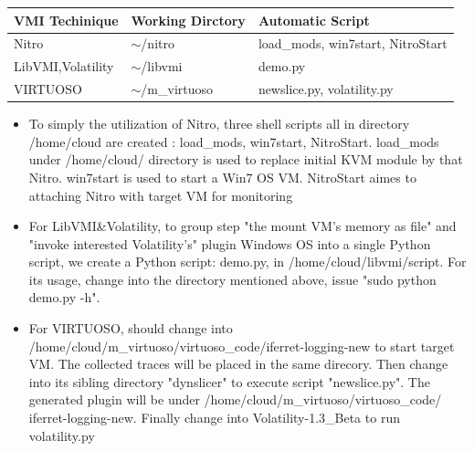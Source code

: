 \documentclass[11pt, oneside]{Thesis} %
\begin{document}
\clearpage %



\begin{center}
    \begin{tabular}{| l |  l | l|}
    \hline
    VMI Techinique & Working Dirctory & Automatic Script  \\ 
    \hline
    Nitro & $\sim$/nitro  & load\_mods, win7start, NitroStart\\ 
    \hline
    LibVMI,Volatility & $\sim$/libvmi & demo.py\\ 
    \hline
    VIRTUOSO & $\sim$/m\_virtuoso & newslice.py, volatility.py \\
    \hline
    \end{tabular}
    \begin{itemize}
     \item To simply the utilization of Nitro, three shell scripts all in directory /home/cloud are created
     : load\_mods, win7start, NitroStart.
     load\_mods under /home/cloud/ directory is used to replace initial KVM module by that Nitro. 
     win7start is used to start a Win7 OS VM. 
     NitroStart aimes to attaching Nitro with target VM for monitoring
     \item For LibVMI\&Volatility, to group step "the mount VM's memory as file" and "invoke interested Volatility's" plugin
     Windows OS into a single Python script, we create a Python script: demo.py, in /home/cloud/libvmi/script. For its usage,
     change into the directory mentioned above, issue "sudo python demo.py -h".
     \item For VIRTUOSO, should change into /home/cloud/m\_virtuoso/virtuoso\_code/iferret-logging-new to start target VM.
     The collected traces will be placed in the same direcory. Then change into its sibling directory "dynslicer" to execute
     script "newslice.py". The generated plugin will be under /home/cloud/m\_virtuoso/virtuoso\_code/ \\
     iferret-logging-new. Finally
     change into Volatility-1.3\_Beta to run volatility.py
     \end{itemize}
\end{center}
\end{document}
